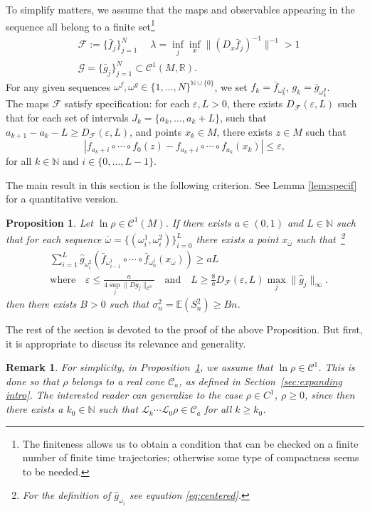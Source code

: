 \documentclass{amsart}
\numberwithin{equation}{section}
\newtheorem{prop}[thm]{Proposition}
\newtheorem{rem}[thm]{Remark}
\newcommand\cC{{\mathcal C}}
\newcommand\cF{{\mathcal F}}
\newcommand\cG{{\mathcal G}}
\newcommand\cL{{\mathcal L}}
\newcommand\bE{{\mathbb E}}
\newcommand\bN{{\mathbb N}}
\newcommand\bR{{\mathbb R}}
\newcommand\ve{\varepsilon}
\begin{document}
To simplify matters, we assume that the maps and observables appearing in the sequence all belong to a finite set\footnote{ The finiteness allows us to obtain a condition that can be checked on a finite number of finite time trajectories; otherwise some type of compactness seems to be needed.}
\[
\begin{split}
&\cF:=\{\bar f_j\}_{j=1}^N\;\quad \lambda=\inf_j\inf_x \|(D_x\bar f_j)^{-1}\|^{-1}>1\\
&\cG=\{\bar g_j\}_{j=1}^{N}\subset \cC^1(M,\bR).
\end{split}
\]
For any given sequences $\omega^f,\omega^g\in \{1,\dots, N\}^{\bN\cup \{0\}}$, we set $f_k=\bar f_{\omega^f_k}$, $g_k=\bar g_{\omega^g_k}$.\\
The maps $\cF$ satisfy specification: for each $\ve, L>0$, there exists $D_{\cF}(\ve,L)$ such that for each set of intervals $J_k=\{a_k,\dots, a_k+L\}$, such that $a_{k+1}-a_k-L\geq D_{\cF}(\ve,L)$, and points $x_k\in M$, there exists $z\in M$ such that 
\[
| f_{a_k+i}\circ\cdots\circ f_{0}(z)- f_{a_k+i}\circ\cdots\circ  f_{a_k}(x_k)|\leq \ve,
\]
for all $k\in\bN$ and $i\in\{0,\dots,L-1\}$.

The main result in this section is the following criterion. See Lemma \ref{lem:specif} for a quantitative version.
\begin{prop}\label{prop:variance}
Let $\ln \rho \in \cC^1(M)$. If there exists $a\in (0,1)$ and $L\in\bN$ such that for each sequence $\overline\omega=\{(\omega^1_i, \omega^2_i)\}_{i=0}^{L}$  there exists a point $x_{\overline\omega}$ such that~\footnote{ For the definition of $\hat g_{\omega_i}$ see equation \eqref{eq:centered}.}
\[
\begin{split}
&\sum_{i=1}^{L} \hat g_{\omega^2_i}(\bar f_{\omega^1_{i-1}}\circ \cdots\circ\bar f_{\omega^1_0}(x_{\overline\omega}))\geq a L\\
&\mbox{where} \quad \ve\leq \frac{a}{4\sup_j\|D \bar g_j\|_{\cC^0}} \quad \mbox{and} \quad L\geq \frac {8} { a} D_{\cF}(\ve,L)\max_j\|\hat g_j\|_\infty.
\end{split}
\]
then there exists $B>0$ such that $\sigma_n^2=\bE(S_n^2)\geq Bn$.
\end{prop}
The rest of the section is devoted to the proof of the above Proposition. But first, it is appropriate to discuss its relevance and generality.

\begin{rem}
For simplicity, in Proposition~\ref{prop:variance}, we assume  that $\ln \rho \in \cC^1$.  This is done so that
$\rho$ belongs to a real cone $\cC_a$, as defined in Section~\ref{sec:expanding intro}.  
The interested reader can generalize to the case $\rho \in C^1$, $\rho \ge 0$, since then there exists a $k_0 \in \bN$ such that $\cL_k \cdots \cL_0 \rho \in \cC_a$ for all $k \ge k_0$.
\end{rem}
\end{document}
